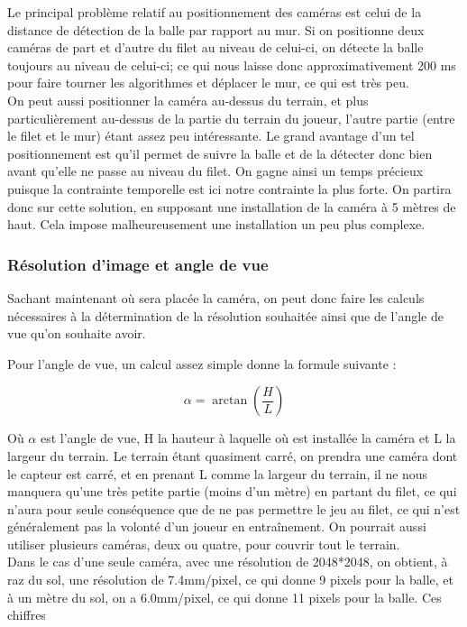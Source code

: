Le principal problème relatif au positionnement des caméras est celui de la distance de détection de la balle par rapport au mur. Si on positionne deux caméras de part et d'autre du filet au niveau de celui-ci, on détecte la balle toujours au niveau de celui-ci; ce qui nous laisse donc approximativement 200 ms pour faire tourner les algorithmes et déplacer le mur, ce qui est très peu. \\

On peut aussi positionner la caméra au-dessus du terrain, et plus particulièrement au-dessus de la partie du terrain du joueur, l'autre partie (entre le filet et le mur) étant assez peu intéressante. Le grand avantage d'un tel positionnement est qu'il permet de suivre la balle et de la détecter donc bien avant qu'elle ne passe au niveau du filet. On gagne ainsi un temps précieux puisque la contrainte temporelle est ici notre contrainte la plus forte. On partira donc sur cette solution, en supposant une installation de la caméra à 5 mètres de haut. Cela impose malheureusement une installation un peu plus complexe.


\subsubsection{Résolution d'image et angle de vue}

Sachant maintenant où sera placée la caméra, on peut donc faire les calculs nécessaires à la détermination de la résolution souhaitée ainsi que de l'angle de vue qu'on souhaite avoir.

Pour l'angle de vue, un calcul assez simple donne la formule suivante : 

$$ \alpha = \arctan ( \frac{H}{L}) $$

Où $\alpha$ est l'angle de vue, H la hauteur à laquelle où est installée la caméra et L la largeur du terrain. Le terrain étant quasiment carré, on prendra une caméra dont le capteur est carré, et en prenant L comme la largeur du terrain, il ne nous manquera qu'une très petite partie (moins d'un mètre) en partant du filet, ce qui n'aura pour seule conséquence que de ne pas permettre le jeu au filet, ce qui n'est généralement pas la volonté d'un joueur en entraînement. On pourrait aussi utiliser plusieurs caméras, deux ou quatre, pour couvrir tout le terrain. \\ 

Dans le cas d'une seule caméra, avec une résolution de 2048*2048, on obtient, à raz du sol, une résolution de 7.4mm/pixel, ce qui donne 9 pixels pour la balle, et à un mètre du sol, on a 6.0mm/pixel, ce qui donne 11 pixels pour la balle. Ces chiffres


